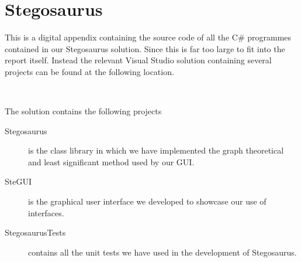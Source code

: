 \chapter{Stegosaurus}
\label{app:C}
This is a digital appendix containing the source code of all the C\# programmes contained in our Stegosaurus solution. 
Since this is far too large to fit into the report itself.
Instead the relevant Visual Studio solution containing several projects can be found at the following location.

\setlength{\parindent}{0pt} {
 \\
}

The solution contains the following projects
\begin{description}
\item[Stegosaurus]
is the class library in which we have implemented the graph theoretical and least significant method used by our GUI.

\item[SteGUI]
is the graphical user interface we developed to showcase our use of interfaces.

\item[StegosaurusTests]
contains all the unit tests we have used in the development of Stegosaurus.
\end{description}
